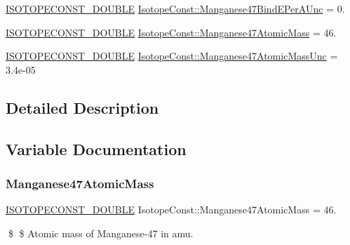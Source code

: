 \begin{DoxyCompactItemize}
\mbox{\hyperlink{group___isotope_const-_macros_ga8f45a7272ce02c0b4c65c44636ed719a}{I\+S\+O\+T\+O\+P\+E\+C\+O\+N\+S\+T\+\_\+\+D\+O\+U\+B\+LE}} \mbox{\hyperlink{group___isotope_const-_manganese-_mn47_ga5a29bf1d357c430083267e0b0848a8ec}{Isotope\+Const\+::\+Manganese47\+Bind\+E\+Per\+A\+Unc}} = 0.
\item 
\mbox{\hyperlink{group___isotope_const-_macros_ga8f45a7272ce02c0b4c65c44636ed719a}{I\+S\+O\+T\+O\+P\+E\+C\+O\+N\+S\+T\+\_\+\+D\+O\+U\+B\+LE}} \mbox{\hyperlink{group___isotope_const-_manganese-_mn47_ga3d9a99765eaaa599c2d68dba1fd55062}{Isotope\+Const\+::\+Manganese47\+Atomic\+Mass}} = 46.
\item 
\mbox{\hyperlink{group___isotope_const-_macros_ga8f45a7272ce02c0b4c65c44636ed719a}{I\+S\+O\+T\+O\+P\+E\+C\+O\+N\+S\+T\+\_\+\+D\+O\+U\+B\+LE}} \mbox{\hyperlink{group___isotope_const-_manganese-_mn47_ga38b00dbb5d5a522fad2691e00da87dc2}{Isotope\+Const\+::\+Manganese47\+Atomic\+Mass\+Unc}} = 3.\+4e-\/05
\end{DoxyCompactItemize}


\subsection{Detailed Description}


\subsection{Variable Documentation}
\mbox{\label{group___isotope_const-_manganese-_mn47_ga3d9a99765eaaa599c2d68dba1fd55062}} 
\subsubsection{\texorpdfstring{Manganese47\+Atomic\+Mass}{Manganese47AtomicMass}}
{\footnotesize\ttfamily \mbox{\hyperlink{group___isotope_const-_macros_ga8f45a7272ce02c0b4c65c44636ed719a}{I\+S\+O\+T\+O\+P\+E\+C\+O\+N\+S\+T\+\_\+\+D\+O\+U\+B\+LE}} Isotope\+Const\+::\+Manganese47\+Atomic\+Mass = 46.}

\$ \$ Atomic mass of Manganese-\/47 in amu. \mbox{\label{group___isotope_const-_manganese-_mn47_ga38b00dbb5d5a522fad2691e00da87dc2}} 
